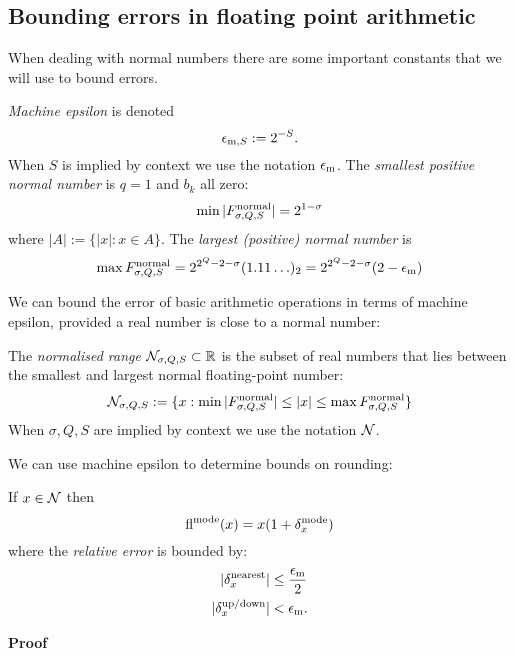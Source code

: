 \subsection{Bounding errors in floating point arithmetic}
When dealing with normal numbers there are some important constants that we will use to bound errors.

\begin{definition} \emph{Machine epsilon} is denoted
\[
\ensuremath{\epsilon}_{{\rm m},S} := 2^{-S}.
\]
When $S$ is implied by context we use the notation $\ensuremath{\epsilon}_{\rm m}$. The \emph{smallest positive normal number} is $q = 1$ and $b_k$ all zero:
\[
\min |F_{\ensuremath{\sigma},Q,S}^{\rm normal}| = 2^{1-\ensuremath{\sigma}}
\]
where $|A| := \{|x| : x \in A \}$. The \emph{largest (positive) normal number} is
\[
\max F_{\ensuremath{\sigma},Q,S}^{\rm normal} = 2^{2^Q-2-\ensuremath{\sigma}} (1.11\ensuremath{\ldots})_2 = 2^{2^Q-2-\ensuremath{\sigma}} (2-\ensuremath{\epsilon}_{\rm m})
\]
\end{definition}

We can bound the error of basic arithmetic operations in terms of machine epsilon, provided a real number is close to a normal number:

\begin{definition} The \emph{normalised range} ${\cal N}_{\sigma,Q,S} \subset {\mathbb R}$ is the subset of real numbers that lies between the smallest and largest normal floating-point number:
\[
{\cal N}_{\ensuremath{\sigma},Q,S} := \{x : \min |F_{\ensuremath{\sigma},Q,S}^{\rm normal}| \ensuremath{\leq} |x| \ensuremath{\leq} \max F_{\ensuremath{\sigma},Q,S}^{\rm normal} \}
\]
When $\ensuremath{\sigma},Q,S$ are implied by context we use the notation ${\cal N}$. \end{definition}

We can use machine epsilon to determine bounds on rounding:

\begin{proposition} If $x \in {\cal N}$ then
\[
{\rm fl}^{\rm mode}(x) = x (1 + \ensuremath{\delta}_x^{\rm mode})
\]
where the \emph{relative error} is bounded by:
\begin{align*}
|\ensuremath{\delta}_x^{\rm nearest}| &\ensuremath{\leq} {\ensuremath{\epsilon}_{\rm m} \over 2} \\
|\ensuremath{\delta}_x^{\rm up/down}| &< {\ensuremath{\epsilon}_{\rm m}}.
\end{align*}
\end{proposition}
\textbf{Proof}

